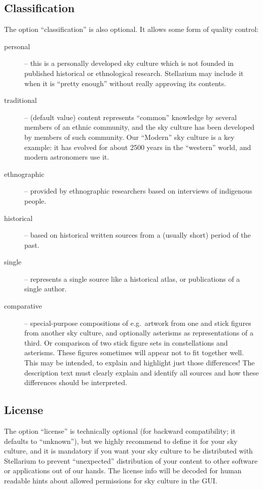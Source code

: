 \subsection{Classification}
The option ``classification'' is also optional.  It allows some form of quality control:
\begin{description}
  \item[personal] -- this is a personally developed sky culture which
    is not founded in published historical or ethnological research. Stellarium
    may include it when it is ``pretty enough'' without really
    approving its contents.
  \item[traditional] -- (default value) content represents ``common'' knowledge by
    several members of an ethnic community, and the sky culture has
    been developed by members of such community. Our ``Modern''
    sky culture is a key example: it has evolved for about 2500 years in the ``western'' world,
    and modern astronomers use it.
  \item[ethnographic] -- provided by ethnographic researchers based on
    interviews of indigenous people.
  \item[historical] -- based on historical written sources from a
    (usually short) period of the past.
  \item[single] -- represents a single source like a historical atlas,
    or publications of a single author.
  \item[comparative] -- special-purpose compositions  of e.g.\ artwork
    from one and stick figures from another sky culture, and optionally
    asterisms as representations of a third. Or comparison of two
    stick figure sets in constellations and asterisms. These figures
    sometimes will appear not to fit together well. This may be
    intended, to explain and highlight just those differences! The
    description text must clearly explain and identify all sources and
    how these differences should be interpreted.
\end{description}

\subsection{License}
\label{sec:skycultures:licenses}
The option ``license''  is technically optional
(for backward compatibility; it defaults to ``unknown''), but we
highly recommend to define it for your sky culture, and it is
mandatory if you want your sky culture to be distributed with
Stellarium to prevent ``unexpected'' distribution of your content to other
software or applications out of our hands.  The license info will be decoded for human
readable hints about allowed permissions for sky culture in the GUI.


